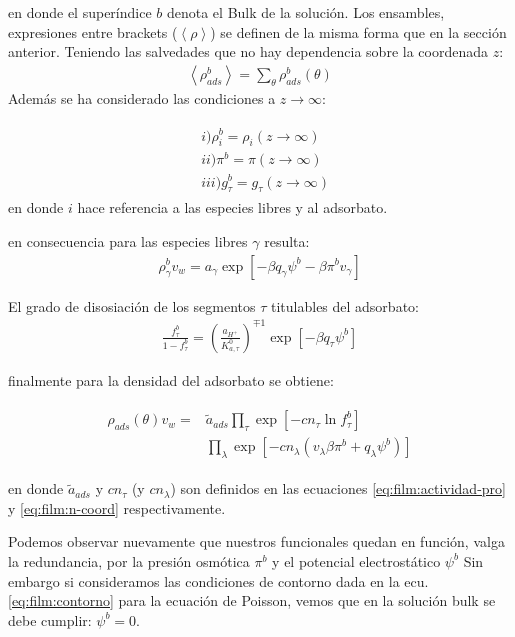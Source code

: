 \noindent en donde el super\'indice $b$ denota el Bulk de la soluci\'on. 
 Los ensambles, expresiones entre brackets ($\left<\rho\right>$) se definen de la misma forma que en la secci\'on anterior. Teniendo las salvedades que no hay dependencia sobre la coordenada $z$:
 \begin{align}
 	\left<\rho^b_{ads}\right> = \sum_{\theta}\rho^b_{ads}(\theta)
 \end{align}
 Adem\'as se ha considerado las condiciones a $z \to \infty$:

\begin{align}
	\begin{aligned}
		& i)\rho^b_i =\rho_i (z \rightarrow \infty)   \\
		& ii)  \pi^b = \pi(z \rightarrow \infty) \\
		& iii) g_\tau^b = g_\tau(z \rightarrow \infty)  
	\end{aligned}
\end{align}
\noindent en donde $i$ hace referencia a las especies libres y al adsorbato. 

en consecuencia para las especies libres $\gamma$ resulta:
\begin{align}
	\rho^b_\gamma v_w = a_\gamma \exp\left[ -\beta q_\gamma \psi^b -\beta \pi^b v_\gamma \right]
	\label{eq:film:rhofree-bulk}
\end{align}

El grado de disosiaci\'on de los segmentos $\tau$ titulables del adsorbato:
\begin{align}
		\frac{f^b_\tau}{1-f^b_\tau} = \left(\frac{a_{H^+}}{K^0_{a,\tau}}\right)^{\mp 1} \exp[-\beta q_\tau \psi^b]
\end{align}


finalmente para la densidad del adsorbato se obtiene:

\begin{align}
	\begin{aligned}
		\rho_{ads}(\theta)v_w = &\tilde{a}_{ads} \prod_\tau \exp\left[-cn_\tau \ln f^b_\tau\right] \\
		& \prod_\lambda \exp \left[-cn_\lambda (v_\lambda\beta\pi^b + q_\lambda \psi^b) \right]
	\end{aligned}
	\label{eq:film:rhopro-bulk}
\end{align}

\noindent en donde $\tilde{a}_{ads}$ y $cn_\tau$ (y $cn_\lambda$) son definidos en las ecuaciones  \ref{eq:film:actividad-pro} y \ref{eq:film:n-coord} respectivamente. 

Podemos observar nuevamente que nuestros funcionales quedan en funci\'on, valga la redundancia, por la presi\'on osm\'otica $\pi^b$ y el potencial electrost\'atico $\psi^b$
Sin embargo si consideramos las condiciones de contorno dada en la ecu. \ref{eq:film:contorno} para la ecuaci\'on de Poisson, vemos que en la soluci\'on bulk se debe cumplir: $\psi^b = 0$. 

